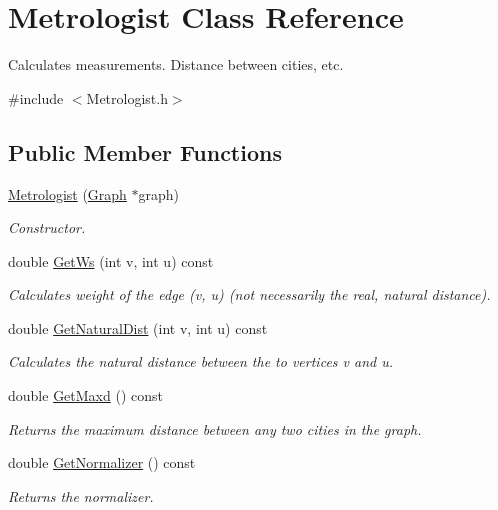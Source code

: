 \hypertarget{classMetrologist}{}\section{Metrologist Class Reference}
\label{classMetrologist}


Calculates measurements. Distance between cities, etc.  




{\ttfamily \#include $<$Metrologist.\+h$>$}

\subsection*{Public Member Functions}
\begin{DoxyCompactItemize}
\item 
\hyperlink{classMetrologist_a9c7df984dd6e43cd827ca327fd2ca970}{Metrologist} (\hyperlink{classGraph}{Graph} $\ast$graph)
\begin{DoxyCompactList}\small\item\em Constructor. \end{DoxyCompactList}\item 
double \hyperlink{classMetrologist_afca60025d9898f54849e8215752ce837}{Get\+Ws} (int v, int u) const
\begin{DoxyCompactList}\small\item\em Calculates weight of the edge (v, u) (not necessarily the real, natural distance). \end{DoxyCompactList}\item 
double \hyperlink{classMetrologist_aa3347f4157d92bf1fcac54c559d0486e}{Get\+Natural\+Dist} (int v, int u) const
\begin{DoxyCompactList}\small\item\em Calculates the natural distance between the to vertices v and u. \end{DoxyCompactList}\item 
\mbox{\label{classMetrologist_a184db704f83b9bf94496637e3e5143b2}} 
double \hyperlink{classMetrologist_a184db704f83b9bf94496637e3e5143b2}{Get\+Maxd} () const
\begin{DoxyCompactList}\small\item\em Returns the maximum distance between any two cities in the graph. \end{DoxyCompactList}\item 
\mbox{\label{classMetrologist_a2f3d6721c03a96125ce62428ec1bc561}} 
double \hyperlink{classMetrologist_a2f3d6721c03a96125ce62428ec1bc561}{Get\+Normalizer} () const
\begin{DoxyCompactList}\small\item\em Returns the normalizer. \end{DoxyCompactList}\end{DoxyCompactItemize}


